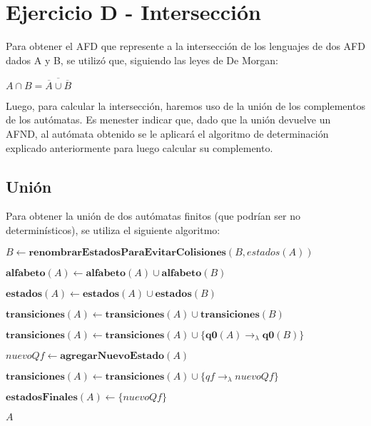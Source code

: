 \section{Ejercicio D - Intersección}

\indent \indent Para obtener el AFD que represente a la intersección de los lenguajes de dos AFD dados A y B, se utilizó que, siguiendo las leyes de De Morgan:\\
\begin{center}
$A \cap B = \overline{\overline{A} \cup \overline{B}}$
\end{center}

\indent Luego, para calcular la intersección, haremos uso de la unión de los complementos de los autómatas. Es menester indicar que, dado que la unión devuelve un AFND, al autómata obtenido se le aplicará el algoritmo de determinación explicado anteriormente para luego calcular su complemento.\\

\subsection{Unión}

\indent \indent Para obtener la unión de dos autómatas finitos (que podrían ser no determinísticos), se utiliza el siguiente algoritmo:\\

\begin{algorithm}
\begin{algorithmic}[1]

    \State $B \gets \textbf{renombrarEstadosParaEvitarColisiones}(B, estados(A)) $

    \State $\textbf{alfabeto}(A) \gets \textbf{alfabeto}(A) \cup \textbf{alfabeto}(B)$

    \State $\textbf{estados}(A) \gets \textbf{estados}(A) \cup \textbf{estados}(B)$

    \State $\textbf{transiciones}(A) \gets \textbf{transiciones}(A) \cup \textbf{transiciones}(B)$

    \State $\textbf{transiciones}(A) \gets \textbf{transiciones}(A) \cup \{\textbf{q0}(A) \rightarrow_{\lambda} \textbf{q0}(B)\}$

    \State $nuevoQf \gets \textbf{agregarNuevoEstado}(A)$


      \State $\textbf{transiciones}(A) \gets \textbf{transiciones}(A) \cup \{qf \rightarrow_{\lambda} nuevoQf\}$
    \EndFor

    \State $\textbf{estadosFinales}(A) \gets \{nuevoQf\}$

    \State \Return $A$
  \EndFunction
\end{algorithmic}
\end{algorithm}
